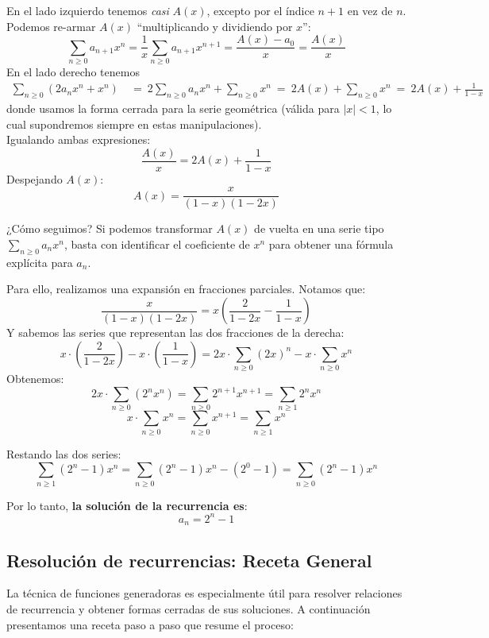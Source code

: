 En el lado izquierdo tenemos \emph{casi} $A(x)$, excepto por el \'indice $n+1$ en vez de $n$. Podemos re-armar $A(x)$ ``multiplicando y dividiendo por $x$'':
\[
\sum_{n \geq 0} a_{n+1} x^n ={\frac{1}{x}\sum_{n\geq 0}{a_{n+1} x^{n+1}} }= \frac{A(x) - a_0}{x} = \frac{A(x)}{x}
\]
 En el lado derecho tenemos 
\begin{align*}
    \sum_{n\geq 0}{(2 a_n x^n + x^n)} &
    ~=~ 2\sum_{n\geq 0}{a_n x^n} + \sum_{n\geq 0}{x^n} 
    ~=~ 2 A(x) +\sum_{n\geq 0} x^n 
    ~=~ 2A(x) + \frac{1}{1-x}
\end{align*}     
donde usamos la forma cerrada para la serie geom\'etrica (v\'alida para 
   $|x|<1$, lo cual supondremos siempre en estas manipulaciones).\\
Igualando ambas expresiones:
\[
\frac{A(x)}{x} = 2A(x) + \frac{1}{1 - x}
\]
Despejando $A(x)$:
\[
A(x) = \frac{x}{(1 - x)(1 - 2x)}
\]

\begin{exampleblock}{¿Cómo seguimos?} Si podemos transformar $A(x)$ de vuelta en una serie tipo $\sum_{n\geq 0}{a_nx^n}$, basta con identificar el coeficiente de $x^n$ para obtener una fórmula explícita para $a_n$.
\end{exampleblock}

Para ello, realizamos una expansión en fracciones parciales. Notamos que:
\[
\frac{x}{(1 - x)(1 - 2x)} = x\left(\frac{2}{1 - 2x} - \frac{1}{1 - x}\right)
\]
Y sabemos las series que representan las dos fracciones de la derecha:
\[
x \cdot \left(\frac{2}{1 - 2x}\right) - x \cdot \left(\frac{1}{1 - x}\right) = 2x \cdot \sum_{n\geq 0}(2x)^n - x \cdot \sum_{n\geq 0} x^n
\]
Obtenemos:
\[
2x \cdot \sum_{n\geq 0}(2^n x^n) = \sum_{n\geq 0} 2^{n+1} x^{n+1} = \sum_{n\geq 1} 2^n x^n
\]
\[
x \cdot \sum_{n\geq 0} x^n = \sum_{n\geq 0} x^{n+1} = \sum_{n\geq 1} x^n
\]

Restando las dos series:
\[
\sum_{n\geq 1}(2^n - 1) x^n = \sum_{n\geq 0}(2^n - 1)x^n - (2^0 - 1) = \sum_{n\geq 0}(2^n - 1)x^n
\]

Por lo tanto, \textbf{la solución de la recurrencia es}:
\[
a_n = 2^n - 1
\]


\subsection{Resolución de recurrencias: Receta General}
La técnica de funciones generadoras es especialmente útil para resolver relaciones de recurrencia y obtener formas cerradas de sus soluciones. A continuación presentamos una receta paso a paso que resume el proceso:

